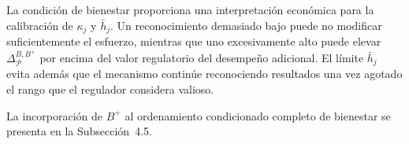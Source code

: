 La condición de bienestar proporciona una interpretación económica para la calibración de \(\kappa_j\) y \(\bar h_j\). Un reconocimiento demasiado bajo puede no modificar suficientemente el esfuerzo, mientras que uno excesivamente alto puede elevar \(\Delta_{\mathcal P}^{B,B^{+}}\) por encima del valor regulatorio del desempeño adicional. El límite \(\bar h_j\) evita además que el mecanismo continúe reconociendo resultados una vez agotado el rango que el regulador considera valioso.

La incorporación de \(B^{+}\) al ordenamiento condicionado completo de bienestar se presenta en la Subsección~4.5.
